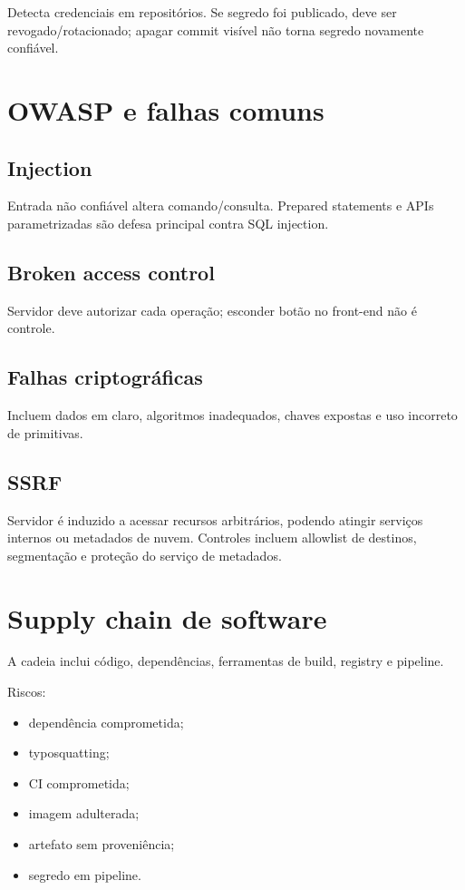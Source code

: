Detecta credenciais em repositórios. Se segredo foi publicado, deve ser revogado/rotacionado; apagar commit visível não torna segredo novamente confiável.

\section{OWASP e falhas comuns}

\subsection{Injection}

Entrada não confiável altera comando/consulta. Prepared statements e APIs parametrizadas são defesa principal contra SQL injection.

\subsection{Broken access control}

Servidor deve autorizar cada operação; esconder botão no front-end não é controle.

\subsection{Falhas criptográficas}

Incluem dados em claro, algoritmos inadequados, chaves expostas e uso incorreto de primitivas.

\subsection{SSRF}

Servidor é induzido a acessar recursos arbitrários, podendo atingir serviços internos ou metadados de nuvem. Controles incluem allowlist de destinos, segmentação e proteção do serviço de metadados.

\section{Supply chain de software}

A cadeia inclui código, dependências, ferramentas de build, registry e pipeline.

Riscos:
\begin{itemize}
\item dependência comprometida;
\item typosquatting;
\item CI comprometida;
\item imagem adulterada;
\item artefato sem proveniência;
\item segredo em pipeline.
\end{itemize}

